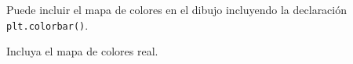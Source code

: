 Puede incluir el mapa de colores en el dibujo incluyendo la declaración \texttt{plt.colorbar()}.\\

\begin{code} Incluya el mapa de colores real.

\begin{Shaded}
\begin{Highlighting}[]

\OperatorTok{=}\NormalTok{ np.array([}\NormalTok{,}\NormalTok{,}\NormalTok{,}\NormalTok{,}\NormalTok{,}\NormalTok{,}\NormalTok{,}\NormalTok{,}\NormalTok{,}\NormalTok{,}\NormalTok{,}\NormalTok{,}\NormalTok{])}
\OperatorTok{=}\NormalTok{ np.array([}\NormalTok{,}\NormalTok{,}\NormalTok{,}\NormalTok{,}\NormalTok{,}\NormalTok{,}\NormalTok{,}\NormalTok{,}\NormalTok{,}\NormalTok{,}\NormalTok{,}\NormalTok{,}\NormalTok{])}
\OperatorTok{=}\NormalTok{ np.array([}\NormalTok{, }\NormalTok{, }\NormalTok{, }\NormalTok{, }\NormalTok{, }\NormalTok{, }\NormalTok{, }\NormalTok{, }\NormalTok{, }\NormalTok{, }\NormalTok{, }\NormalTok{, }\NormalTok{])}

\OperatorTok{=}\OperatorTok{=}\NormalTok{)}


\end{Highlighting}
\end{Shaded}


\end{code}
